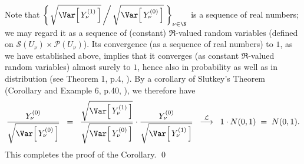 Note that $\left\{\left. \sqrt{\Var\!\left[\,Y^{(1)}_{\nu}\,\right]} \,\right/ \sqrt{\Var\!\left[\,Y^{(0)}_{\nu}\,\right]}\;\right\}_{\nu\in\N}$
is a sequence of real numbers; we may regard it as a sequence of (constant) $\Re$-valued random variables
(defined on $\mathcal{S}(U_{\nu}) \times \mathcal{P}(U_{\nu})$).
Its convergence (as a sequence of real numbers) to $1$, as we have established above, implies that it converges
(as constant $\Re$-valued random variables) almost surely to $1$, hence also in probability as well as in distribution
(see Theorem 1, p.4, \cite{Ferguson1996}).
By a corollary of Slutkey's Theorem (Corollary and Example 6, p.40, \cite{Ferguson1996}), we therefore have
\begin{equation*}
\dfrac{Y^{(0)}_{\nu}}{\sqrt{\Var\!\left[\,Y^{(0)}_{\nu}\,\right]}}
\;\; = \;\;
\dfrac{\sqrt{\Var\!\left[\,Y^{(1)}_{\nu}\,\right]}}{\sqrt{\Var\!\left[\,Y^{(0)}_{\nu}\,\right]}}
\cdot
\dfrac{Y^{(0)}_{\nu}}{\sqrt{\Var\!\left[\,Y^{(1)}_{\nu}\,\right]}}
\;\;\overset{\mathcal{L}}{\longrightarrow}\;\;
1 \cdot N(0,1) \; = \; N(0,1).
\end{equation*}
This completes the proof of the Corollary.
\qed

